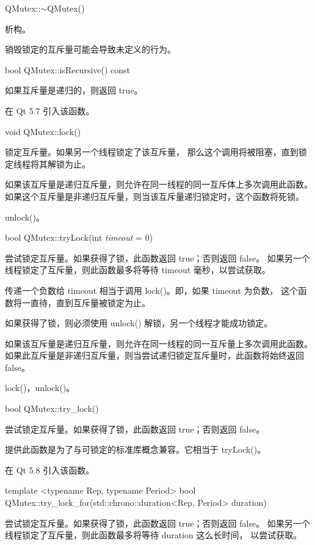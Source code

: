 QMutex::$\sim$QMutex()

析构。

\begin{warning}
销毁锁定的互斥量可能会导致未定义的行为。
\end{warning}

bool QMutex::isRecursive() const

如果互斥量是递归的，则返回 true。

在 Qt 5.7 引入该函数。

void QMutex::lock()

锁定互斥量。如果另一个线程锁定了该互斥量，
那么这个调用将被阻塞，直到锁定线程将其解锁为止。

如果该互斥量是递归互斥量，则允许在同一线程的同一互斥体上多次调用此函数。
如果这个互斥量是非递归互斥量，则当该互斥量递归锁定时，这个函数将死锁。

\begin{seeAlso}
unlock()。
\end{seeAlso}

bool QMutex::tryLock(int \emph{timeout} = 0)

尝试锁定互斥量。如果获得了锁，此函数返回 true；否则返回 false。
如果另一个线程锁定了互斥量，则此函数最多将等待 timeout 毫秒，以尝试获取。

\begin{notice}
传递一个负数给 timeout 相当于调用 lock()。即，如果 timeout 为负数，
这个函数将一直待，直到互斥量被锁定为止。
\end{notice}

如果获得了锁，则必须使用 unlock() 解锁，另一个线程才能成功锁定。

如果该互斥量是递归互斥量，则允许在同一线程的同一互斥量上多次调用此函数。
如果此互斥量是非递归互斥量，则当尝试递归锁定互斥量时，此函数将始终返回 false。

\begin{seeAlso}
lock()，unlock()。
\end{seeAlso}

bool QMutex::try\_lock()

尝试锁定互斥量。如果获得了锁，此函数返回 true；否则返回 false。

提供此函数是为了与可锁定的标准库概念兼容。它相当于 tryLock()。

在 Qt 5.8 引入该函数。

template <typename Rep, typename Period> bool QMutex::try\_lock\_for(std::chrono::duration<Rep, Period> duration)

尝试锁定互斥量。如果获得了锁，此函数返回 true；否则返回 false。
如果另一个线程锁定了互斥量，则此函数最多将等待 duration 这么长时间，
以尝试获取。

